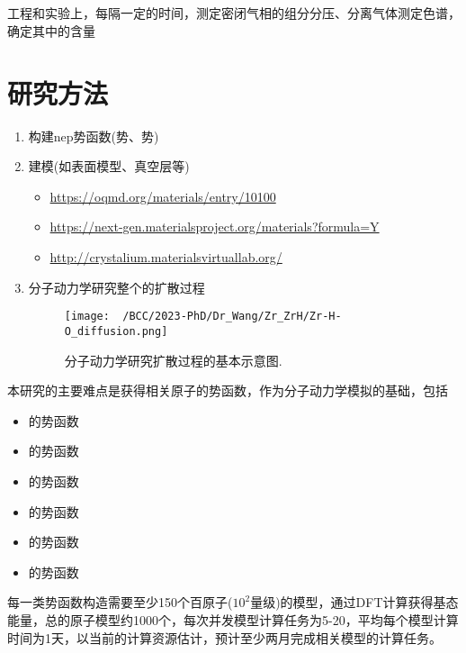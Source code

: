 {\centering
{}\\
 \\
 \\
\\
}

工程和实验上，每隔一定的时间，测定密闭气相的组分分压、分离气体测定色谱，确定其中的含量

\section{研究方法}
\begin{enumerate}
	\item 构建\textrm{nep}势函数(势、势)

	\item 建模(如表面模型、真空层等)
		\begin{itemize}
			\item \url{https://oqmd.org/materials/entry/10100}
			\item \url{https://next-gen.materialsproject.org/materials?formula=Y}
			\item \url{http://crystalium.materialsvirtuallab.org/}
		\end{itemize}
	\item 分子动力学研究整个的扩散过程
\begin{figure}[!ht]
\centering
\vspace*{-0.05in}
\texttt{[image: ~/BCC/2023-PhD/Dr\_Wang/Zr\_ZrH/Zr-H-O\_diffusion.png]}
\caption{分子动力学研究扩散过程的基本示意图.}
\label{Fig:Zr-H-O_diffusion}
\end{figure}
\end{enumerate}

本研究的主要难点是获得相关原子的势函数，作为分子动力学模拟的基础，包括
\begin{itemize}
	\item {}的势函数
	\item {}的势函数
	\item {}的势函数
	\item {}的势函数
	\item {}的势函数
	\item {}的势函数
\end{itemize}
每一类势函数构造需要至少150个百原子($10^2$量级)的模型，通过\textrm{DFT}计算获得基态能量，总的原子模型约1000个，每次并发模型计算任务为5-20，平均每个模型计算时间为1天，以当前的计算资源估计，预计至少两月完成相关模型的计算任务。

